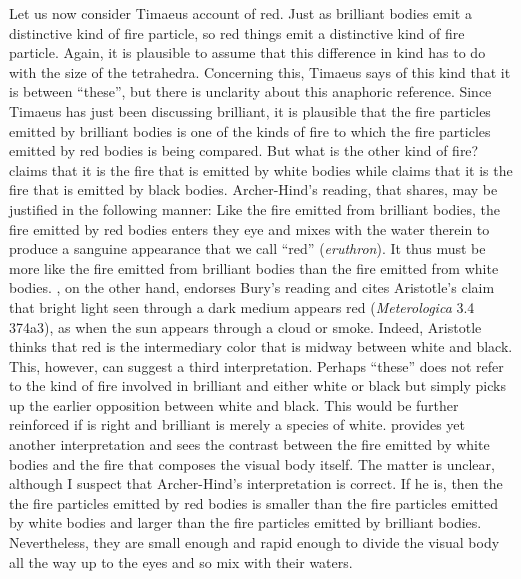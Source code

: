 Let us now consider Timaeus account of red. Just as brilliant bodies emit a distinctive kind of fire particle, so red things emit a distinctive kind of fire particle. Again, it is plausible to assume that this difference in kind has to do with the size of the tetrahedra. Concerning this, Timaeus says of this kind that it is between ``these'', but there is unclarity about this anaphoric reference. Since Timaeus has just been discussing brilliant, it is plausible that the fire particles emitted by brilliant bodies is one of the kinds of fire to which the fire particles emitted by red bodies is being compared. But what is the other kind of fire? \citet[250 n8]{Archer-Hind:1888qd} claims that it is the fire that is emitted by white bodies while \citet[67 n3]{Bury:1929jb} claims that it is the fire that is emitted by black bodies. Archer-Hind's reading, that \citet[168]{Brisson:1997qr} shares, may be justified in the following manner: Like the fire emitted from brilliant bodies, the fire emitted by red bodies enters they eye and mixes with the water therein to produce a sanguine appearance that we call ``red'' (\emph{eruthron}). It thus must be more like the fire emitted from brilliant bodies than the fire emitted from white bodies. \citet[277 n2]{Cornford:1935fk}, on the other hand, endorses Bury's reading and cites Aristotle's claim that bright light seen through a dark medium appears red (\emph{Meterologica} 3.4 374a3), as when the sun appears through a cloud or smoke. Indeed, Aristotle thinks that red is the intermediary color that is midway between white and black. This, however, can suggest a third interpretation. Perhaps ``these'' does not refer to the kind of fire involved in brilliant and either white or black but simply picks up the earlier opposition between white and black. This would be further reinforced if \citet{Levides:2002aa} is right and brilliant is merely a species of white. \citet[482]{Taylor:1928qb} provides yet another interpretation and sees the contrast between the fire emitted by white bodies and the fire that composes the visual body itself. The matter is unclear, although I suspect that Archer-Hind's interpretation is correct. If he is, then the the fire particles emitted by red bodies is smaller than the fire particles emitted by white bodies and larger than the fire particles emitted by brilliant bodies. Nevertheless, they are small enough and rapid enough to divide the visual body all the way up to the eyes and so mix with their waters.

